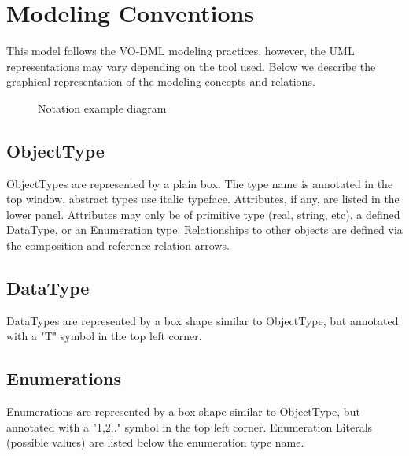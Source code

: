 \pagebreak
\section{Modeling Conventions}
This model follows the VO-DML modeling practices, however, the UML representations may vary depending on the tool used.  Below we describe the graphical representation of the modeling concepts and relations.

  \begin{figure}[h]
  \begin{center}
    \caption{Notation example diagram}\label{fig:notation_example}
  \end{center}
  \end{figure}

  \subsection{ObjectType}
  \label{sect:ObjectType}
  ObjectTypes are represented by a plain box. The type name is annotated in the top window, abstract
types use italic typeface. Attributes, if any, are listed in the lower panel. Attributes may only be
of primitive type (real, string, etc), a defined DataType, or an Enumeration type. Relationships to
other objects are defined via the composition and reference relation arrows.

  \subsection{DataType}
  \label{sect:DataType}
  DataTypes are represented by a box shape similar to ObjectType, but annotated with a "T" symbol in the top left corner.

  \subsection{Enumerations}
  \label{sect:Enumerations}
  Enumerations are represented by a box shape similar to ObjectType, but annotated with a "1,2.."
symbol in the top left corner. Enumeration Literals (possible values) are listed below the
enumeration type name.

